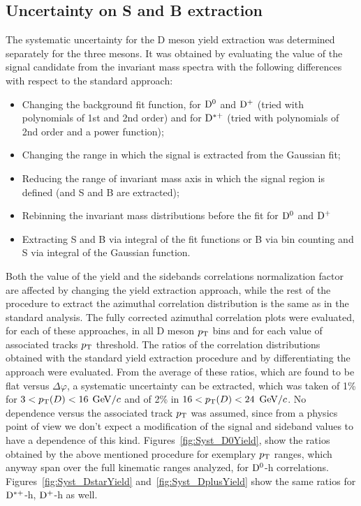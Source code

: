 \subsection{Uncertainty on S and B extraction}


The systematic uncertainty for the D meson yield extraction was determined separately for the three mesons. It was obtained by evaluating the value of the signal candidate from the invariant mass spectra with the following differences with respect to the standard approach:
\begin{itemize}
    \item Changing the background fit function, for ${\rm D^0}$ and ${\rm D^+}$ (tried with polynomials of 1st and 2nd order) and for ${\rm D^{*+}}$ (tried with polynomials of 2nd order and a power function);
    \item Changing the range in which the signal is extracted from the Gaussian fit;
    \item Reducing the range of invariant mass axis in which the signal region is defined (and S and B are extracted);
    \item Rebinning the invariant mass distributions before the fit for ${\rm D^0}$ and ${\rm D^+}$
    \item Extracting S and B via integral of the fit functions or B via bin counting and S via integral of the Gaussian function.
\end{itemize}

Both the value of the yield and the sidebands correlations normalization factor are affected by changing the yield extraction approach, while the rest of the procedure to extract the azimuthal correlation distribution is the same as in the standard analysis. The fully corrected azimuthal correlation plots were evaluated, for each of these approaches, in all D meson $p_{\rm T}$ bins and for each value of associated tracks $p_{\rm T}$ threshold.
The ratios of the correlation distributions obtained with the standard yield extraction procedure and by differentiating the approach were evaluated. From the average of these ratios, which are found to be flat versus $\Delta\varphi$, a systematic uncertainty can be extracted, which was taken of 1\% for $3 < p_{\rm T}(D) < 16$ $\mathrm{GeV}/c$ and of 2\% in $16 < p_{\rm T}(D) < 24$ $\mathrm{GeV}/c$. No dependence versus the associated track $p_{\rm T}$ was assumed, since from a physics point of view we don't expect a modification of the signal and sideband values to have a dependence of this kind.
Figures~\ref{fig:Syst_D0Yield}, show the ratios obtained by the above mentioned procedure for exemplary $p_{\rm T}$ ranges, which anyway span over the full kinematic ranges analyzed, for ${\rm D^0}$-h correlations. Figures~\ref{fig:Syst_DstarYield} and~\ref{fig:Syst_DplusYield} show the same ratios for ${\rm D^{*+}}$-h, ${\rm D^+}$-h as well.

